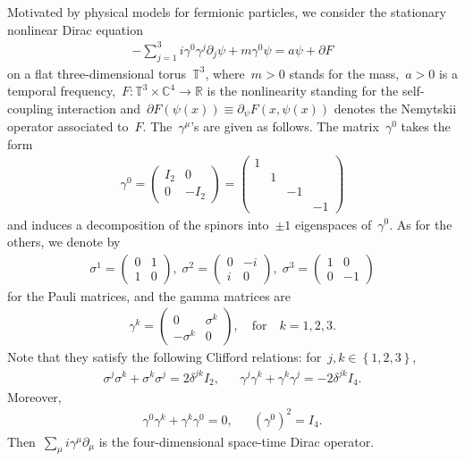 \documentclass[11pt,final]{amsart}
\newcommand{\p}{\partial}
\newcommand{\R}{\mathbb{R}}
\newcommand{\C}{\mathbb{C}}
\newcommand{\T}{\mathbb{T}}
\newcommand{\braces}[1]{\left\{#1\right\}} %
\begin{document}
Motivated by physical models for fermionic particles, we consider the stationary nonlinear Dirac equation
\begin{align}\label{eq:NDE-spatial}
    -\sum_{j=1}^3 i\gamma^0\gamma^j\p_j\psi + m\gamma^0\psi =a\psi + \p F
\end{align}
on a flat three-dimensional torus~$\T^3$, where~$m>0$ stands for the mass,~$a>0$ is a temporal frequency,~$F\colon \T^3\times \C^4\to \R$ is the nonlinearity standing for the self-coupling interaction and~$\p F(\psi(x))\equiv \p_\psi F(x,\psi(x))$ denotes the Nemytskii operator associated to~$F$.
The~$\gamma^\mu$'s are given as follows.
The matrix~$\gamma^0$ takes the form
\begin{align}
    \gamma^0= \begin{pmatrix} I_2 & 0 \\ 0 & -I_2\end{pmatrix}
    =\begin{pmatrix}
        1 & & &  \\ & 1 & & \\ & & -1 & \\ & &  & -1
    \end{pmatrix}
\end{align}
and induces a decomposition of the spinors into~$\pm1$ eigenspaces of~$\gamma^0$.
As for the others, we denote by
\begin{align}
    {\sigma^1} = \left( {\begin{array}{*{20}{c}}
			{0}&1 \\
			1&{0}
	\end{array}} \right),\;{\sigma^2} = \left( {\begin{array}{*{20}{c}}
			{0}&{ - i} \\
			i&{0}
	\end{array}} \right),\;{\sigma^3} = \left( {\begin{array}{*{20}{c}}
			1&{0} \\
			{0}&{ - 1}
	\end{array}} \right)
\end{align}
for the Pauli matrices, and the gamma matrices are
\begin{align}
    {\gamma^k} = \left( {\begin{array}{*{20}{c}}
			{0}&{{\sigma^k}} \\
			{{-\sigma^k}}&{0}
	\end{array}} \right),\quad\text{for}\quad k= 1, 2, 3.
\end{align}
Note that they satisfy the following Clifford relations: for~$j,k\in\braces{1,2,3}$,
\begin{align}
    \sigma^j\sigma^k+\sigma^k\sigma^j= 2\delta^{jk}I_2, & &
    \gamma^j\gamma^k + \gamma^k\gamma^j= -2\delta^{jk}I_4.
\end{align}
Moreover,
\begin{align}
    \gamma^0\gamma^k + \gamma^k \gamma^0 =0, & &
    (\gamma^0)^2=I_4.
\end{align}
Then~$\sum_{\mu} i\gamma^\mu \p_\mu$ is the four-dimensional space-time Dirac operator.
\end{document}
